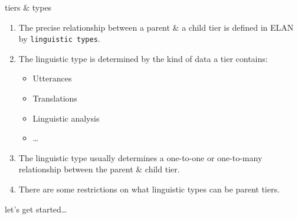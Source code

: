 \documentclass{beamer}
\begin{document}
   \begin{frame}{tiers \& types}
    \begin{enumerate}
      \item<1-> The precise relationship between a parent \& a child tier is defined in ELAN by \texttt{linguistic types}.
      \item<2-> The linguistic type is determined by the kind of data a tier contains:
        \begin{itemize}
          \item<3-> Utterances 
          \item<3-> Translations
          \item<3-> Linguistic analysis
          \item<3-> \ldots
        \end{itemize}
      \item<4-> The linguistic type usually determines a one-to-one or one-to-many relationship between the parent \& child tier.
      \item<5-> There are some restrictions on what linguistic types can be parent tiers.
    \end{enumerate}
   \end{frame}
    
   \begin{frame}{let's get started\ldots}
      \begin{figure}[htbp]
      \begin{center}
         \setlength\fboxsep{0pt}
         \setlength\fboxrule{0pt}
      \end{center}
      \end{figure}
   \end{frame}
   
\end{document}
